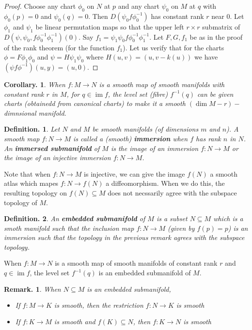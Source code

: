 \documentclass[11pt, a4paper]{memoir}
\theoremstyle{change}
\newtheorem{corollary}[theorem]{Corollary.}
\theoremstyle{plain}
\theoremstyle{nonumberplain}
\newtheorem{definition}{Definition.}
\newtheorem{remark}{Remark.}
\newtheorem{proof}{Proof}
\DeclareMathOperator{\im}{im}
\numberwithin{equation}{section}
\begin{document}
\begin{proof}
    Choose any chart $\phi_0$ on $N$ at $p$ and any chart $\psi_0$ on $M$ at $q$ with $\phi_0(p)=0$ and $\psi_0(q)=0$.
    Then $D(\psi_0f\phi_0^{-1})$ has constant rank $r$ near $0$.
    Let $\phi_1$ and $\psi_1$ be linear permutation maps so that the upper left $r\times r$ submatrix of $D(\psi,\psi_0,f\phi_0^{-1}\phi_1^{-1})(0)$.
    Say $f_1=\psi_1\psi_0 f\phi_0^{-1}\phi_1^{-1}$.
    Let $F,G,f_1$ be as in the proof of the rank theorem (for the function $f_1$).
    Let us verify that for the charts $\phi=F\phi_1\phi_0$ and $\psi=H\psi_1\psi_0$ where $H(u,v)=(u,v-k(u))$ we have $(\psi f\phi^{-1})(u,y)=(u,0)$.
\end{proof}
\begin{corollary}
    When $f:M\to N$ is a smooth map of smooth manifolds with constant rank $r$ in $M$, for $q\in\im f$, the level set (fibre) $f^{-1}(q)$ can be given charts (obtainedd from canonical charts) to make it a smooth $(\dim M-r)-$dimnsional manifold.
\end{corollary}
\begin{definition}
    Let $N$ and $M$ be smooth manifolds (of dimensions $m$ and $n$).
    A smooth map $f:N\to M$ is called a (smooth) \textbf{immersion} when $f$ has rank $n$ in $N$.
    An \textbf{immersed submanifold} of $M$ is the image of an immersion $f:N\to M$ or the image of an injective immersion $f:N\to M$.
\end{definition}
Note that when $f:N\to M$ is injective, we can give the image $f(N)$ a smooth atlas which mapes $f:N\to f(N)$ a diffeomorphism.
When we do this, the resulting topology on $f(N)\subseteq M$ does not necssarily agree with the subspace topology of $M$.
\begin{definition}
    An \textbf{embedded submanifold} of $M$ is a subset $N\subseteq M$ which is a smoth manifold such that the inclusion map $f:N\to M$ (given by $f(p)=p$) is an immersion such that the topology in the previous remark agrees with the subspace topology.
\end{definition}
When $f:M\to N$ is a smooth map of smooth manifolds of constant rank $r$ and $q\in\im f$, the level set $f^{-1}(q)$ is an embedded submanifold of $M$.
\begin{remark}
    When $N\subseteq M$ is an embedded submanifold,
    \begin{itemize}[nl]
        \item If $f:M\to K$ is smooth, then the restriction $f:N\to K$ is smooth
        \item If $f:K\to M$ is smooth and $f(K)\subseteq N$, then $f:K\to N$ is smooth
    \end{itemize}
\end{remark}
\end{document}
